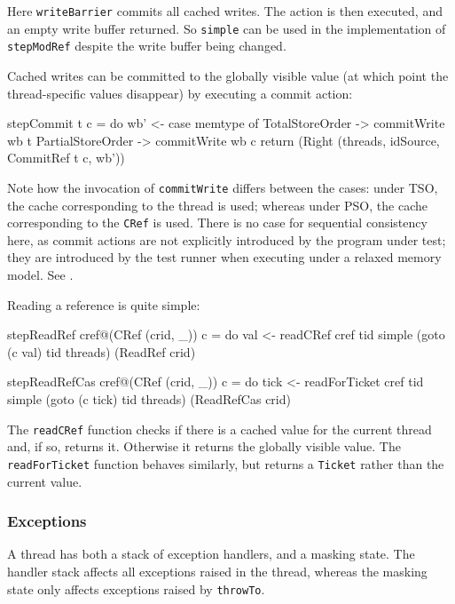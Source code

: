 Here \verb|writeBarrier| commits all cached writes. The action is then
executed, and an empty write buffer returned. So \verb|simple| can be
used in the implementation of \verb|stepModRef| despite the write
buffer being changed.

Cached writes can be committed to the globally visible value (at which
point the thread-specific values disappear) by executing a commit
action:

\begin{haskellcode}
stepCommit t c = do
  wb' <- case memtype of
    TotalStoreOrder   -> commitWrite wb t
    PartialStoreOrder -> commitWrite wb c
  return (Right (threads, idSource, CommitRef t c, wb'))
\end{haskellcode}

Note how the invocation of \verb|commitWrite| differs between the
cases: under TSO, the cache corresponding to the thread is used;
whereas under PSO, the cache corresponding to the \verb|CRef| is
used. There is no case for sequential consistency here, as commit
actions are not explicitly introduced by the program under test; they
are introduced by the test runner when executing under a relaxed
memory model. See .

Reading a reference is quite simple:

\begin{haskellcode}
stepReadRef cref@(CRef (crid, _)) c = do
  val <- readCRef cref tid
  simple (goto (c val) tid threads) (ReadRef crid)

stepReadRefCas cref@(CRef (crid, _)) c = do
  tick <- readForTicket cref tid
  simple (goto (c tick) tid threads) (ReadRefCas crid)
\end{haskellcode}

The \verb|readCRef| function checks if there is a cached value for the
current thread and, if so, returns it. Otherwise it returns the
globally visible value. The \verb|readForTicket| function behaves
similarly, but returns a \verb|Ticket| rather than the current value.

\subsubsection{Exceptions}
\label{sec:execution-stepwise-exception}

A thread has both a stack of exception handlers, and a masking
state. The handler stack affects all exceptions raised in the thread,
whereas the masking state only affects exceptions raised by
\verb|throwTo|.

